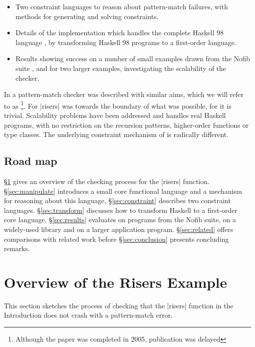 \begin{itemize}
\item Two constraint languages to reason about pattern-match failures, with methods for generating and solving constraints.
\item Details of the \catch{} implementation which handles the complete Haskell 98 language \citep{haskell}, by transforming Haskell 98 programs to a first-order language.
\item Results showing success on a number of small examples drawn from the Nofib suite \citep{nofib}, and for two larger examples, investigating the scalability of the checker.
\end{itemize}

In \citet{me:catch_tfp} a pattern-match checker was described with similar aims, which we will refer to as \oldtool{}\footnote{Although the paper was completed in 2005, publication was delayed}. For \oldtool{} |risers| was towards the boundary of what was possible, for \newtool{} it is trivial. Scalability problems have been addressed and \newtool{} handles real Haskell programs, with no restriction on the recursion patterns, higher-order functions or type classes. The underlying constraint mechanism of \newtool{} is radically different.

\subsection{Road map}

\S\ref{sec:walkthrough} gives an overview of the checking process for the |risers| function. \S\ref{sec:manipulate} introduces a small core functional language and a mechanism for reasoning about this language, \S\ref{sec:constraint} describes two constraint languages. \S\ref{sec:transform} discusses how to transform Haskell to a first-order core language. \S\ref{sec:results} evaluates \newtool{} on programs from the Nofib suite, on a widely-used library and on a larger application program. \S\ref{sec:related} offers comparisons with related work before \S\ref{sec:conclusion} presents concluding remarks.

\section{Overview of the Risers Example}
\label{sec:walkthrough}

This section sketches the process of checking that the |risers| function in the Introduction does not crash with a pattern-match error.


